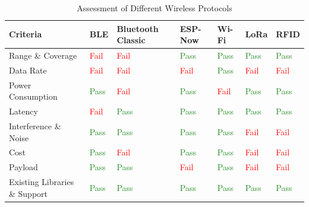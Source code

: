 \documentclass[class=report,11pt,crop=false]{standalone}
\begin{document}
\begin{table}[h]
\centering
\begin{tabular}{|l|l|l|l|l|l|l|}
\hline
\textbf{Criteria} & \textbf{BLE} & \textbf{Bluetooth Classic} & \textbf{ESP-Now} & \textbf{Wi-Fi} & \textbf{LoRa} & \textbf{RFID} \\
\hline
Range \& Coverage & \textcolor{red}{Fail} & \textcolor{red}{Fail} & \textcolor{ForestGreen}{Pass} & \textcolor{ForestGreen}{Pass} & \textcolor{ForestGreen}{Pass} & \textcolor{ForestGreen}{Pass} \\
\hline
Data Rate & \textcolor{red}{Fail} & \textcolor{red}{Fail} & \textcolor{red}{Fail} & \textcolor{ForestGreen}{Pass} & \textcolor{red}{Fail} & \textcolor{red}{Fail} \\
\hline
Power Consumption & \textcolor{ForestGreen}{Pass} & \textcolor{red}{Fail} & \textcolor{ForestGreen}{Pass} & \textcolor{red}{Fail} & \textcolor{ForestGreen}{Pass} & \textcolor{ForestGreen}{Pass} \\
\hline
Latency & \textcolor{red}{Fail} & \textcolor{ForestGreen}{Pass} & \textcolor{ForestGreen}{Pass} & \textcolor{ForestGreen}{Pass} & \textcolor{ForestGreen}{Pass} & \textcolor{ForestGreen}{Pass} \\
\hline
Interference \& Noise & \textcolor{ForestGreen}{Pass} & \textcolor{ForestGreen}{Pass} & \textcolor{ForestGreen}{Pass} & \textcolor{ForestGreen}{Pass} & \textcolor{red}{Fail} & \textcolor{red}{Fail} \\
\hline
Cost & \textcolor{ForestGreen}{Pass} & \textcolor{red}{Fail} & \textcolor{ForestGreen}{Pass} & \textcolor{ForestGreen}{Pass} & \textcolor{red}{Fail} & \textcolor{red}{Fail} \\
\hline
Payload & \textcolor{ForestGreen}{Pass} & \textcolor{ForestGreen}{Pass} & \textcolor{red}{Fail} & \textcolor{ForestGreen}{Pass} & \textcolor{red}{Fail} & \textcolor{red}{Fail} \\
\hline
Existing Libraries \& Support & \textcolor{ForestGreen}{Pass} & \textcolor{ForestGreen}{Pass} & \textcolor{ForestGreen}{Pass} & \textcolor{ForestGreen}{Pass} & \textcolor{ForestGreen}{Pass} & \textcolor{ForestGreen}{Pass} \\
\hline
\end{tabular}
\caption{Assessment of Different Wireless Protocols}
\label{tab:HW_Comm_Result}
\end{table}
\end{document}
